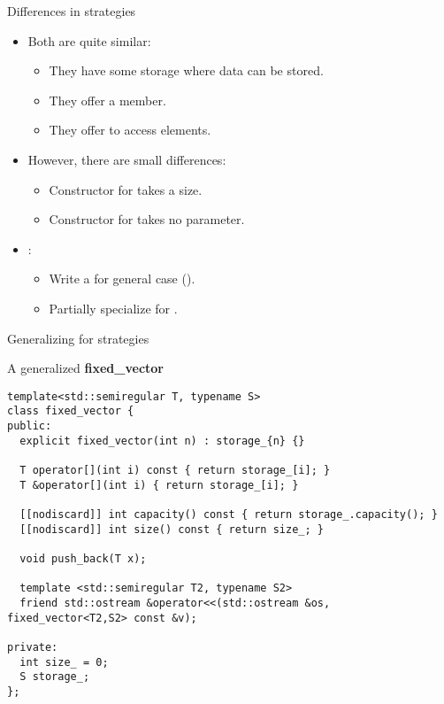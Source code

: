 \begin{frame}[t,fragile]{Differences in strategies}
\begin{itemize}
  \item Both  are quite similar:
    \begin{itemize}
      \item They have some storage where data can be stored.
      \item They offer a  member.
      \item They offer  to access elements.
    \end{itemize}

  \item However, there are small differences:
    \begin{itemize}
      \item Constructor for  takes a size.
      \item Constructor for  takes no parameter.
    \end{itemize}

  \item {}:
    \begin{itemize}
      \item Write a  for general case ().
      \item Partially specialize for .
    \end{itemize}
\end{itemize}
\end{frame}

\begin{frame}[t,fragile,shrink=10]{Generalizing for strategies}
\begin{block}{A generalized \textbf{fixed\_vector}}
\begin{lstlisting}
template<std::semiregular T, typename S>
class fixed_vector {
public:
  explicit fixed_vector(int n) : storage_{n} {}

  T operator[](int i) const { return storage_[i]; }
  T &operator[](int i) { return storage_[i]; }

  [[nodiscard]] int capacity() const { return storage_.capacity(); }
  [[nodiscard]] int size() const { return size_; }

  void push_back(T x);

  template <std::semiregular T2, typename S2>
  friend std::ostream &operator<<(std::ostream &os, fixed_vector<T2,S2> const &v);

private:
  int size_ = 0;
  S storage_;
};
\end{lstlisting}
\end{block}
\end{frame}

